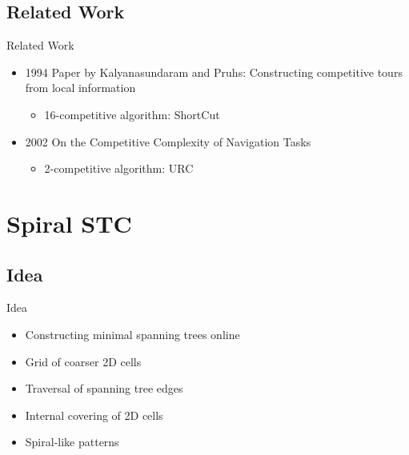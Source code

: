 \documentclass{beamer}
\begin{document}
\subsection{Related Work}
\begin{frame}{Related Work}
    \begin{itemize}
        \item 1994 Paper by Kalyanasundaram and Pruhs: Constructing competitive tours from local information
              \begin{itemize}
                  \item 16-competitive algorithm: ShortCut
              \end{itemize}
        \item 2002 On the Competitive Complexity of Navigation Tasks
              \begin{itemize}
                  \item 2-competitive algorithm: URC
              \end{itemize}
    \end{itemize}
\end{frame}

\section{Spiral STC}
\subsection{Idea}
\begin{frame}{Idea}
    \begin{itemize}
        \item Constructing minimal spanning trees online
        \item Grid of coarser 2D cells
        \item Traversal of spanning tree edges
        \item Internal covering of 2D cells
        \item Spiral-like patterns
    \end{itemize}
\end{frame}
\end{document}
